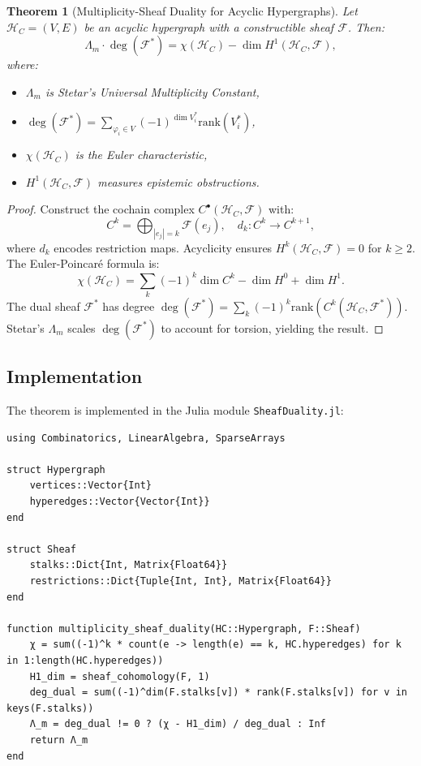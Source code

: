 \documentclass[12pt]{article}
\newcommand{\rank}{\text{rank}}
\newtheorem{theorem}{Theorem}[section]
\begin{document}
\begin{theorem}[Multiplicity-Sheaf Duality for Acyclic Hypergraphs]
Let \(\mathcal{H}_C = (V, E)\) be an acyclic hypergraph with a constructible sheaf \(\mathcal{F}\). Then:
\[
\Lambda_m \cdot \deg(\mathcal{F}^\ast) = \chi(\mathcal{H}_C) - \dim H^1(\mathcal{H}_C, \mathcal{F}),
\]
where:
\begin{itemize}
    \item \(\Lambda_m\) is Stetar's Universal Multiplicity Constant,
    \item \(\deg(\mathcal{F}^\ast) = \sum_{\varphi_i \in V} (-1)^{\dim V_i^\ast} \rank(V_i^\ast)\),
    \item \(\chi(\mathcal{H}_C)\) is the Euler characteristic,
    \item \(H^1(\mathcal{H}_C, \mathcal{F})\) measures epistemic obstructions.
\end{itemize}
\end{theorem}

\begin{proof}
Construct the cochain complex \(C^\bullet(\mathcal{H}_C, \mathcal{F})\) with:
\[
C^k = \bigoplus_{|e_j|=k} \mathcal{F}(e_j), \quad d_k: C^k \to C^{k+1},
\]
where \(d_k\) encodes restriction maps. Acyclicity ensures \(H^k(\mathcal{H}_C, \mathcal{F}) = 0\) for \(k \geq 2\). The Euler-Poincaré formula is:
\[
\chi(\mathcal{H}_C) = \sum_k (-1)^k \dim C^k - \dim H^0 + \dim H^1.
\]
The dual sheaf \(\mathcal{F}^\ast\) has degree \(\deg(\mathcal{F}^\ast) = \sum_k (-1)^k \rank(C^k(\mathcal{H}_C, \mathcal{F}^\ast))\). Stetar's \(\Lambda_m\) scales \(\deg(\mathcal{F}^\ast)\) to account for torsion, yielding the result.
\end{proof}

\subsection{Implementation}
The theorem is implemented in the Julia module \texttt{SheafDuality.jl}:

\begin{verbatim}
using Combinatorics, LinearAlgebra, SparseArrays

struct Hypergraph
    vertices::Vector{Int}
    hyperedges::Vector{Vector{Int}}
end

struct Sheaf
    stalks::Dict{Int, Matrix{Float64}}
    restrictions::Dict{Tuple{Int, Int}, Matrix{Float64}}
end

function multiplicity_sheaf_duality(HC::Hypergraph, F::Sheaf)
    χ = sum((-1)^k * count(e -> length(e) == k, HC.hyperedges) for k in 1:length(HC.hyperedges))
    H1_dim = sheaf_cohomology(F, 1)
    deg_dual = sum((-1)^dim(F.stalks[v]) * rank(F.stalks[v]) for v in keys(F.stalks))
    Λ_m = deg_dual != 0 ? (χ - H1_dim) / deg_dual : Inf
    return Λ_m
end
\end{verbatim}
\end{document}
